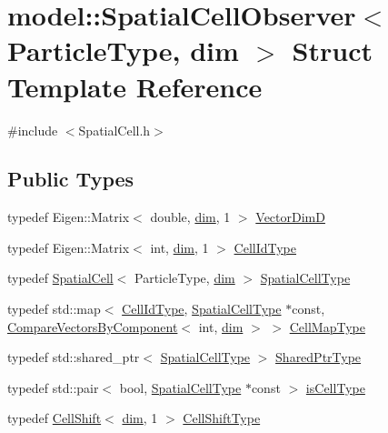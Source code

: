 \hypertarget{structmodel_1_1_spatial_cell_observer}{}\section{model\+:\+:Spatial\+Cell\+Observer$<$ Particle\+Type, dim $>$ Struct Template Reference}
\label{structmodel_1_1_spatial_cell_observer}


{\ttfamily \#include $<$Spatial\+Cell.\+h$>$}

\subsection*{Public Types}
\begin{DoxyCompactItemize}
\item 
typedef Eigen\+::\+Matrix$<$ double, \hyperlink{plot_nd_a_8m_a382f3ca768b275b8d563604f7fc7df73}{dim}, 1 $>$ \hyperlink{structmodel_1_1_spatial_cell_observer_a9b73220477f451fa7981e2597f23614b}{Vector\+Dim\+D}
\item 
typedef Eigen\+::\+Matrix$<$ int, \hyperlink{plot_nd_a_8m_a382f3ca768b275b8d563604f7fc7df73}{dim}, 1 $>$ \hyperlink{structmodel_1_1_spatial_cell_observer_a4463a457f13bd480c87facc50799832b}{Cell\+Id\+Type}
\item 
typedef \hyperlink{structmodel_1_1_spatial_cell}{Spatial\+Cell}$<$ Particle\+Type, \hyperlink{plot_nd_a_8m_a382f3ca768b275b8d563604f7fc7df73}{dim} $>$ \hyperlink{structmodel_1_1_spatial_cell_observer_a276f0ef902c63265b8236fb591d8a1f9}{Spatial\+Cell\+Type}
\item 
typedef std\+::map$<$ \hyperlink{structmodel_1_1_spatial_cell_observer_a4463a457f13bd480c87facc50799832b}{Cell\+Id\+Type}, \hyperlink{structmodel_1_1_spatial_cell_observer_a276f0ef902c63265b8236fb591d8a1f9}{Spatial\+Cell\+Type} $\ast$const, \hyperlink{structmodel_1_1_compare_vectors_by_component}{Compare\+Vectors\+By\+Component}$<$ int, \hyperlink{plot_nd_a_8m_a382f3ca768b275b8d563604f7fc7df73}{dim} $>$ $>$ \hyperlink{structmodel_1_1_spatial_cell_observer_a3ee3ac7a68725cbe49ef4ae951ce2231}{Cell\+Map\+Type}
\item 
typedef std\+::shared\+\_\+ptr$<$ \hyperlink{structmodel_1_1_spatial_cell_observer_a276f0ef902c63265b8236fb591d8a1f9}{Spatial\+Cell\+Type} $>$ \hyperlink{structmodel_1_1_spatial_cell_observer_ae879e58433ae1725fa700b08b790b2cd}{Shared\+Ptr\+Type}
\item 
typedef std\+::pair$<$ bool, \hyperlink{structmodel_1_1_spatial_cell_observer_a276f0ef902c63265b8236fb591d8a1f9}{Spatial\+Cell\+Type} $\ast$const  $>$ \hyperlink{structmodel_1_1_spatial_cell_observer_a8308b4c6ce9d94f1f29b80a41e3374b5}{is\+Cell\+Type}
\item 
typedef \hyperlink{classmodel_1_1_cell_shift}{Cell\+Shift}$<$ \hyperlink{plot_nd_a_8m_a382f3ca768b275b8d563604f7fc7df73}{dim}, 1 $>$ \hyperlink{structmodel_1_1_spatial_cell_observer_a5e02c4303a1bcb2dee305e5e5556f517}{Cell\+Shift\+Type}
\end{DoxyCompactItemize}
